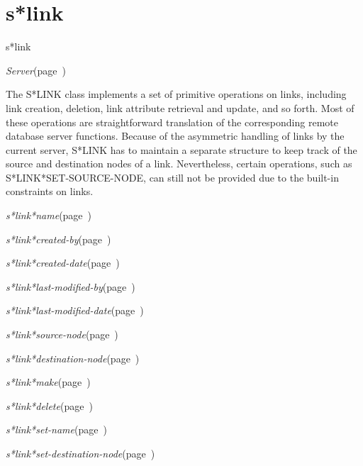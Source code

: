 \section{s*link}
\label{s*link}

\begin{description}
\item [Name:]  s*link

\item [Layer:] {\sl Server}\hfill(page~\pageref{Server})

\item [Description:]
The S*LINK class implements a set of primitive
operations on links, including link creation, deletion,
link attribute retrieval and update, and so forth.
Most of these operations are straightforward
translation of the corresponding remote database server
functions. Because of the asymmetric handling of links
by the current server, S*LINK has to maintain a
separate structure to keep track of the source and
destination nodes of a link. Nevertheless, certain
operations, such as S*LINK*SET-SOURCE-NODE, can still
not be provided due to the built-in constraints on
links.

\item [Attributes:]
\item {\sl s*link*name}\hfill(page~\pageref{s*link*name})
\item {\sl s*link*created-by}\hfill(page~\pageref{s*link*created-by})
\item {\sl s*link*created-date}\hfill(page~\pageref{s*link*created-date})
\item {\sl s*link*last-modified-by}\hfill(page~\pageref{s*link*last-modified-by})
\item {\sl s*link*last-modified-date}\hfill(page~\pageref{s*link*last-modified-date})
\item {\sl s*link*source-node}\hfill(page~\pageref{s*link*source-node})
\item {\sl s*link*destination-node}\hfill(page~\pageref{s*link*destination-node})

\item [Operations:]
\item {\sl s*link*make}\hfill(page~\pageref{s*link*make})
\item {\sl s*link*delete}\hfill(page~\pageref{s*link*delete})
\item {\sl s*link*set-name}\hfill(page~\pageref{s*link*set-name})
\item {\sl s*link*set-destination-node}\hfill(page~\pageref{s*link*set-destination-node})

\item [Collections:]

\item [Subclasses:]

\item [Superclasses:]



\end{description}
\horizontalline

